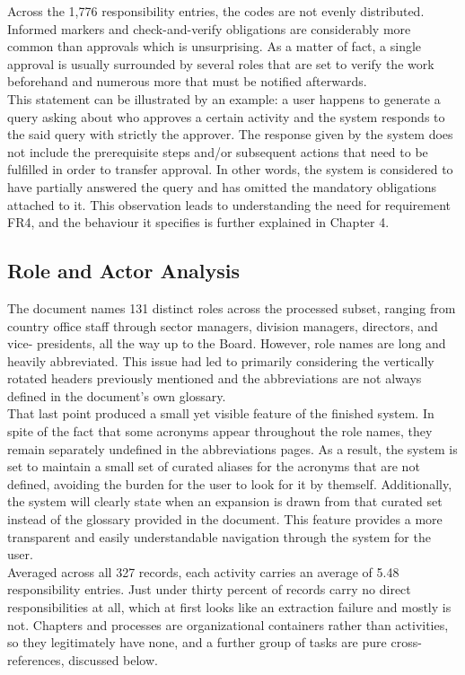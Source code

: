 Across the 1,776 responsibility entries, the codes are not evenly distributed. Informed markers and check-and-verify obligations are considerably more common than approvals which is unsurprising. As a matter of fact, a single approval is usually surrounded by several roles that are set to verify the work beforehand and numerous more that must be notified afterwards.\\[0.3cm]
This statement can be illustrated by an example: a user happens to generate a query asking about who approves a certain activity and the system responds to the said query with strictly the approver. The response given by the system does not include the prerequisite steps and/or subsequent actions that need to be fulfilled in order to transfer approval. In other words, the system is considered to have partially answered the query and has omitted the mandatory obligations attached to it. This observation leads to understanding the need for requirement FR4, and the behaviour it specifies is further explained in Chapter 4.

\subsection{Role and Actor Analysis}

The document names 131 distinct roles across the processed subset, ranging from country office staff through sector managers, division managers, directors, and vice- presidents, all the way up to the Board. However, role names are long and heavily abbreviated. This issue had led to primarily considering the vertically rotated headers previously mentioned and the abbreviations are not always defined in the document’s own glossary.\\[0.3cm]
That last point produced a small yet visible feature of the finished system. In spite of the fact that some acronyms appear throughout the role names, they remain separately undefined  in the abbreviations pages. As a result, the system is set to maintain a small set of curated aliases for the acronyms that are not defined, avoiding the burden for the user to look for it by themself. Additionally, the system will clearly state when an expansion is drawn from that curated set instead of the glossary provided in the document. This feature provides a more transparent and easily understandable navigation through the system for the user. \\[0.3cm]
Averaged across all 327 records, each activity carries an average of  5.48 responsibility entries. Just under thirty percent of records carry no direct responsibilities at all, which at first looks like an extraction failure and mostly is not. Chapters and processes are organizational containers rather than activities, so they legitimately have none, and a further group of tasks are pure cross-references, discussed below.

